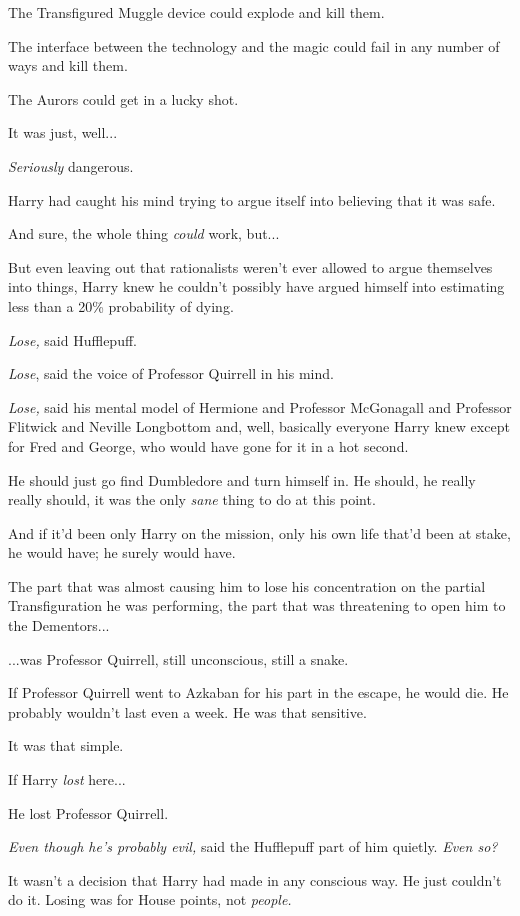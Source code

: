 The Transfigured Muggle device could explode and kill them.

The interface between the technology and the magic could fail in any number of ways and kill them.

The Aurors could get in a lucky shot.

It was just, well...

\emph{Seriously} dangerous.

Harry had caught his mind trying to argue itself into believing that it was safe.

And sure, the whole thing \emph{could} work, but...

But even leaving out that rationalists weren’t ever allowed to argue themselves into things, Harry knew he couldn’t possibly have argued himself into estimating less than a 20\% probability of dying.

\emph{Lose,} said Hufflepuff.

\emph{Lose}, said the voice of Professor Quirrell in his mind.

\emph{Lose,} said his mental model of Hermione and Professor McGonagall and Professor Flitwick and Neville Longbottom and, well, basically everyone Harry knew except for Fred and George, who would have gone for it in a hot second.

He should just go find Dumbledore and turn himself in. He should, he really really should, it was the only \emph{sane} thing to do at this point.

And if it’d been only Harry on the mission, only his own life that’d been at stake, he would have; he surely would have.

The part that was almost causing him to lose his concentration on the partial Transfiguration he was performing, the part that was threatening to open him to the Dementors...

...was Professor Quirrell, still unconscious, still a snake.

If Professor Quirrell went to Azkaban for his part in the escape, he would die. He probably wouldn’t last even a week. He was that sensitive.

It was that simple.

If Harry \emph{lost} here...

He lost Professor Quirrell.

\emph{Even though he’s probably evil,} said the Hufflepuff part of him quietly. \emph{Even so?}

It wasn’t a decision that Harry had made in any conscious way. He just couldn’t do it. Losing was for House points, not \emph{people.}

